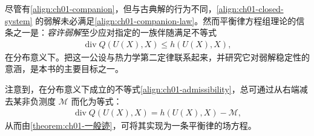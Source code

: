 \documentclass[../../main.tex]{subfiles}
\begin{document}
尽管有\cref{align:ch01-companion}，但与古典解的行为不同，\cref{align:ch01-closed-system} 的弱解未必满足\cref{align:ch01-companion-law}。然而平衡律方程组理论的信条之一是：\emph{容许弱解}至少应对指定的一族伴随满足不等式
\begin{align}
\operatorname{div} Q(U(X),X)\leqslant h(U(X),X),\label{align:ch01-admissibility}
\end{align}
在分布意义下。把这一公设与热力学第二定律联系起来，并研究它对弱解稳定性的意涵，是本书的主要目标之一。

注意到，在分布意义下成立的不等式\cref{align:ch01-admissibility}，总可通过从右端减去某非负测度 $\mathscr{M}$ 而化为等式：
\begin{align}
\operatorname{div} Q(U(X),X)=h(U(X),X)-\mathscr{M},\label{align:ch01-admissibility-equality}
\end{align}
从而由\cref{theorem:ch01-一般迹}，可将其实现为一条平衡律的场方程。
\end{document}
